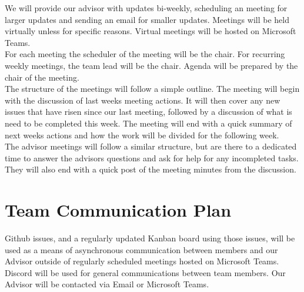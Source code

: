 \documentclass{article}
\begin{document}
We will provide our advisor with updates bi-weekly, scheduling an meeting
for larger updates and sending an email for smaller updates. Meetings will
be held virtually unless for specific reasons. Virtual meetings will be hosted on
Microsoft Teams.\\

For each meeting the scheduler of the meeting will be the chair. 
For recurring weekly meetings, the team lead will be the chair. 
Agenda will be prepared by the chair of the meeting.\\

The structure of the meetings will follow a simple outline. The meeting will begin with the discussion of last weeks meeting actions.
It will then cover any new issues that have risen since our last meeting, followed by a discussion of what is need to be completed this week. The meeting will end with a quick summary of next weeks actions and how the work will be divided for the following week.\\

The advisor meetings will follow a similar structure, but are there to a dedicated time to answer the advisors questions and ask for help for any incompleted tasks. They will also end with a quick post of the meeting minutes from the discussion. 
\section{Team Communication Plan}

Github issues, and a regularly updated Kanban board using those issues, will be used as a means of asynchronous communication 
between members and our Advisor outside of regularly scheduled meetings hosted on Microsoft Teams. 
Discord will be used for general communications between team members. Our Advisor will be contacted via Email or Microsoft Teams.
\end{document}
